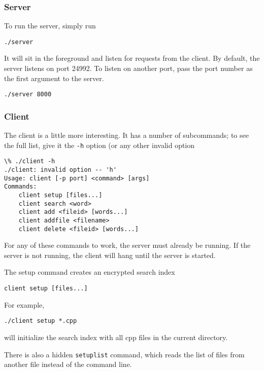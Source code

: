 \subsubsection{Server}

To run the server, simply run

\begin{lstlisting}
./server
\end{lstlisting}

It will sit in the foreground and listen for requests from the client.
By default, the server listens on port 24992.
To listen on another port, pass the port number as the first argument to the server.

\begin{lstlisting}
./server 8000
\end{lstlisting}

\subsubsection{Client}

The client is a little more interesting.
It has a number of subcommands;
to see the full list, give it the \texttt{-h} option (or any other invalid option

\begin{lstlisting}
\% ./client -h
./client: invalid option -- 'h'
Usage: client [-p port] <command> [args]
Commands:
    client setup [files...]
    client search <word>
    client add <fileid> [words...]
    client addfile <filename>
    client delete <fileid> [words...]
\end{lstlisting}

For any of these commands to work, the server must already be running.
If the server is not running, the client will hang until the server is started.


The setup command creates an encrypted search index

\begin{lstlisting}
client setup [files...]
\end{lstlisting}

For example,

\begin{lstlisting}
./client setup *.cpp
\end{lstlisting}

will initialize the search index with all cpp files in the current directory.

There is also a hidden \texttt{setuplist} command, which reads the list of files from another file
instead of the command line.

